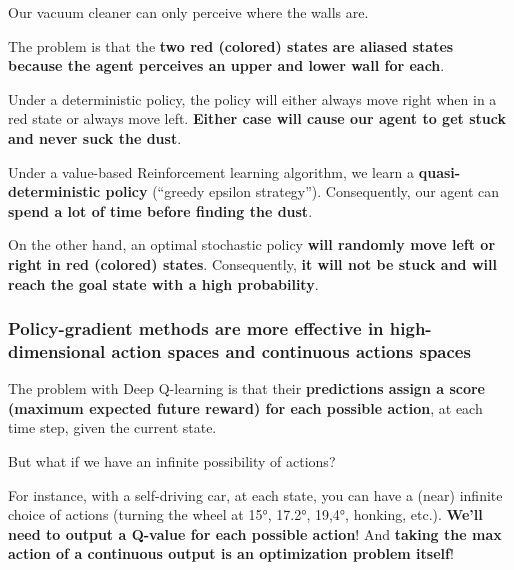\documentclass[11pt,a4paper]{article}
\begin{document}

Our vacuum cleaner can only perceive where the walls are.

The problem is that the \textbf{two red (colored) states are aliased states because the agent perceives an upper and lower wall for each}.


Under a deterministic policy, the policy will either always move right when in a red state or always move left. \textbf{Either case will cause our agent to get stuck and never suck the dust}.

Under a value-based Reinforcement learning algorithm, we learn a \textbf{quasi-deterministic policy} (``greedy epsilon strategy''). Consequently, our agent can \textbf{spend a lot of time before finding the dust}.

On the other hand, an optimal stochastic policy \textbf{will randomly move left or right in red (colored) states}. Consequently, \textbf{it will not be stuck and will reach the goal state with a high probability}.


\subsubsection{Policy-gradient methods are more effective in high-dimensional action spaces and continuous actions spaces}\label{policy-gradient-methods-are-more-effective-in-high-dimensional-action-spaces-and-continuous-actions-spaces}

The problem with Deep Q-learning is that their \textbf{predictions assign a score (maximum expected future reward) for each possible action}, at each time step, given the current state.

But what if we have an infinite possibility of actions?

For instance, with a self-driving car, at each state, you can have a (near) infinite choice of actions (turning the wheel at 15°, 17.2°, 19,4°, honking, etc.). \textbf{We'll need to output a Q-value for each possible action}! And \textbf{taking the max action of a continuous output is an optimization problem itself}!
\end{document}
